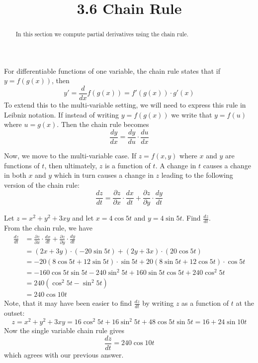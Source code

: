 \documentclass[handout]{ximera}
\title{3.6 Chain Rule}
\begin{document}
\begin{abstract}
In this section we compute partial derivatives using the chain rule.
\end{abstract}

\maketitle

For differentiable functions of one variable, the chain rule states that if $y = f(g(x))$, then 
\[
y' = \frac{d}{dx} f(g(x)) = f'(g(x)) \cdot g'(x)
\]
To extend this to the multi-variable setting, we will need to express this rule in Leibniz notation.
If instead of writing $y = f(g(x))$ we write that $y = f(u)$ where $ u = g(x)$.
Then the chain rule becomes
\[
\frac{dy}{dx} = \frac{dy}{du} \cdot \frac{du}{dx}
\]

Now, we move to the multi-variable case. If $z = f(x,y)$ where $x$ and $y$ are functions of $t$, then ultimately, $z$ is a function of $t$.
A change in $t$ causes a change in both $x$ and $y$ which in turn causes a change in $z$ leading to the following version of the chain rule:
\[
\frac{dz}{dt} = \frac{\partial z}{\partial x} \cdot \frac{dx}{dt} + \frac{\partial z}{\partial y} \cdot \frac{dy}{dt}
\]

\begin{example}[Example 1]
Let $z = x^2 + y^2 + 3xy$ and let $x = 4\cos 5t$ and $y = 4\sin 5t$. Find $\frac{dz}{dt}$.\\
From the chain rule, we have
\begin{align*}
\frac{dz}{dt} &= \frac{\partial z}{\partial x} \cdot \frac{dx}{dt} + \frac{\partial z}{\partial y} \cdot \frac{dy}{dt}\\
              &= \left(2x + 3y\right) \cdot \left(-20 \sin 5t\right) + \left(2y + 3x\right) \cdot \left(20 \cos 5t\right)\\
              &= -20(8 \cos 5t + 12 \sin 5t) \cdot \sin 5t  + 20 (8 \sin 5t + 12 \cos 5t) \cdot \cos 5t \\
              &= -160 \cos 5t \sin 5t -240 \sin^2 5t + 160 \sin 5t \cos 5t + 240 \cos^2 5t\\
              &= 240 (\cos^2 5t - \sin^2 5t)\\
              &= 240 \cos 10t
\end{align*}
Note, that it may have been easier to find $\frac{dz}{dt}$ by writing $z$ as a function of $t$ at the outset:
\[
z = x^2 + y^2 + 3xy = 16 \cos^2 5t + 16 \sin^2 5t + 48 \cos 5t \sin 5t = 16 + 24 \sin 10t
\]
Now the single variable chain rule gives
\[
\frac{dz}{dt} = 240 \cos 10t
\]
which agrees with our previous answer.
\end{example}
\end{document}
